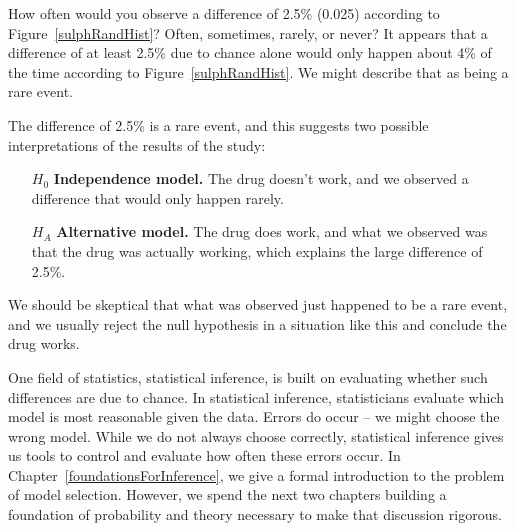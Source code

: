 \begin{example}{How often would you observe a difference of 2.5\% (0.025) according to Figure~\ref{sulphRandHist}? Often, sometimes, rarely, or never?}
It appears that a difference of at least 2.5\% due to chance alone would only happen about 4\% of the time according to Figure~\ref{sulphRandHist}. We might describe that as being a rare event.
\end{example}

The difference of 2.5\% is a rare event, and this suggests two possible interpretations of the results of the study:
\begin{itemize}
\setlength{\itemsep}{0mm}
\item[$H_0$] \textbf{Independence model.} The drug doesn't work, and we observed a difference that would only happen rarely.
\item[$H_A$] \textbf{Alternative model.} The drug does work, and what we observed was that the drug was actually working, which explains the large difference of 2.5\%.
\end{itemize}
We should be skeptical that what was observed just happened to be a rare event, and we usually reject the null hypothesis in a situation like this and conclude the drug works.

One field of statistics, statistical inference, is built on evaluating whether such differences are due to chance. In statistical inference, statisticians evaluate which model is most reasonable given the data. Errors do occur -- we might choose the wrong model. While we do not always choose correctly, statistical inference gives us tools to control and evaluate how often these errors occur. In Chapter~\ref{foundationsForInference}, we give a formal introduction to the problem of model selection. However, we spend the next two chapters building a foundation of probability and theory necessary to make that discussion rigorous.



